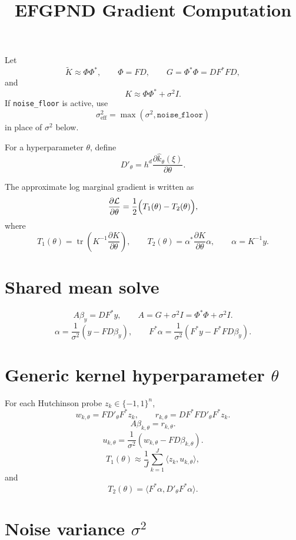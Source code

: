 \documentclass[11pt]{article}
\title{EFGPND Gradient Computation}
\author{}
\date{}
\begin{document}
\maketitle

Let
\[
\widetilde K \approx \Phi \Phi^\ast,
\qquad
\Phi = F D,
\qquad
G = \Phi^\ast \Phi = D F^\ast F D,
\]
and
\[
K \approx \Phi \Phi^\ast + \sigma^2 I.
\]
If \texttt{noise\_floor} is active, use
\[
\sigma_{\mathrm{eff}}^2 = \max(\sigma^2,\texttt{noise\_floor})
\]
in place of $\sigma^2$ below.

For a hyperparameter $\theta$, define
\[
D'_\theta = h^d \frac{\partial \widehat k_\theta(\xi)}{\partial \theta}.
\]

The approximate log marginal gradient is written as
\[
\frac{\partial \mathcal L}{\partial \theta}
=
\frac{1}{2}\Bigl(T_1(\theta) - T_2(\theta)\Bigr),
\]
where
\[
T_1(\theta)
=
\operatorname{tr}\!\left(K^{-1}\frac{\partial K}{\partial \theta}\right),
\qquad
T_2(\theta)
=
\alpha^\ast \frac{\partial K}{\partial \theta}\alpha,
\qquad
\alpha = K^{-1} y.
\]

\section*{Shared mean solve}

\[
A \beta_y = D F^\ast y,
\qquad
A = G + \sigma^2 I = \Phi^\ast \Phi + \sigma^2 I.
\]
\[
\alpha = \frac{1}{\sigma^2}\left(y - F D \beta_y\right),
\qquad
F^\ast \alpha = \frac{1}{\sigma^2}\left(F^\ast y - F^\ast F D \beta_y\right).
\]

\section*{Generic kernel hyperparameter $\theta$}

For each Hutchinson probe $z_k \in \{-1,1\}^n$,
\[
w_{k,\theta} = F D'_\theta F^\ast z_k,
\qquad
r_{k,\theta} = D F^\ast F D'_\theta F^\ast z_k.
\]
\[
A \beta_{k,\theta} = r_{k,\theta}.
\]
\[
u_{k,\theta}
=
\frac{1}{\sigma^2}\left(w_{k,\theta} - F D \beta_{k,\theta}\right).
\]
\[
T_1(\theta)
\approx
\frac{1}{J}\sum_{k=1}^J \langle z_k, u_{k,\theta} \rangle,
\]
and
\[
T_2(\theta)
=
\langle F^\ast \alpha, D'_\theta F^\ast \alpha \rangle.
\]

\section*{Noise variance $\sigma^2$}
\end{document}
